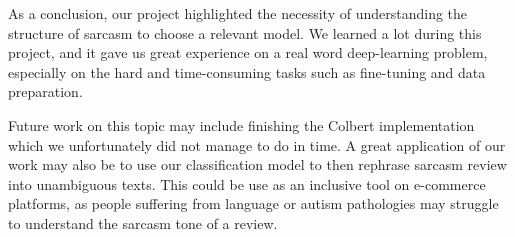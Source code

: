 \documentclass[10pt,twocolumn,letterpaper]{article}
\begin{document}
As a conclusion, our project highlighted the necessity of understanding the structure of sarcasm to choose a relevant model.
We learned a lot during this project, and it gave us great experience on a real word deep-learning problem, especially on the hard and time-consuming tasks such as fine-tuning and data preparation.

Future work on this topic may include finishing the Colbert implementation which we unfortunately did not manage to do in time.
A great application of our work may also be to use our classification model to then rephrase sarcasm review into unambiguous texts.
This could be use as an inclusive tool on e-commerce platforms, as people suffering from language or autism pathologies may struggle to understand the sarcasm tone of a review.



\nocite{*}
{\small


}
\end{document}
